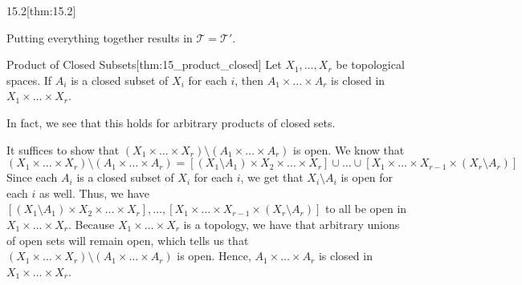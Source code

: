 \begin{thmBox}{15.2}[thm:15.2]
\begin{proofBox}
        \baseSkip

        Putting everything together results in \( \mathcal{T} = \mathcal{T}' \).
    \end{proofBox}
\end{thmBox}

\begin{thmBox}{Product of Closed Subsets}[thm:15_product_closed]
    Let \( X_{ 1 } , \ldots , X_{ r } \) be topological spaces.
    If \( A_{ i } \) is a closed subset of \( X_{ i } \) for each \( i \), then 
    \( A_{ 1 } \times \ldots \times A_{ r } \) is closed in 
    \( X_{ 1 } \times \ldots \times X_{ r } \).

    \baseSkip

    In fact, we see that this holds for arbitrary products of closed sets.

    \baseRule

    \begin{proofBox}
        It suffices to show that \( ( X_{ 1 } \times \ldots \times X_{ r } )
        \setminus ( A_{ 1 } \times \ldots \times A_{ r } ) \) is open.
        We know that 
        \begin{equation*}
            ( X_{ 1 } \times \ldots \times X_{ r } )
            \setminus
            ( A_{ 1 } \times \ldots \times A_{ r } )
            =
            [ 
                ( X_{ 1 } \setminus A_{ 1 } ) \times X_{ 2 } 
                \times \ldots \times 
                X_{ r } 
            ]
            \cup \ldots \cup 
            [ 
                X_{ 1 } 
                \times \ldots \times 
                X_{ r - 1 } \times ( X_{ r } \setminus A_{ r } )
            ]
        \end{equation*}
        Since each \( A_{ i } \) is a closed subset of \( X_{ i } \) for each 
        \( i \), we get that \( X_{ i } \setminus A_{ i } \) is open for each 
        \( i \) as well.
        Thus, we have 
        \(
            [
                ( X_{ 1 } \setminus A_{ 1 } ) \times X_{ 2 } 
                \times \ldots \times 
                X_{ r }
            ]
            , \ldots , 
            [
                X_{ 1 } 
                \times \ldots \times 
                X_{ r - 1 } \times ( X_{ r } \setminus A_{ r } )
            ]
        \)
        to all be open in \( X_{ 1 } \times \ldots \times X_{ r } \).
        Because \( X_{ 1 } \times \ldots \times X_{ r } \) is a topology, 
        we have that arbitrary unions of open sets will remain open, 
        which tells us that \( ( X_{ 1 } \times \ldots \times X_{ r } )
        \setminus ( A_{ 1 } \times \ldots \times A_{ r } ) \) is open.
        Hence, \( A_{ 1 } \times \ldots \times A_{ r } \) is closed in 
        \( X_{ 1 } \times \ldots \times X_{ r } \).
    \end{proofBox}
\end{thmBox}
